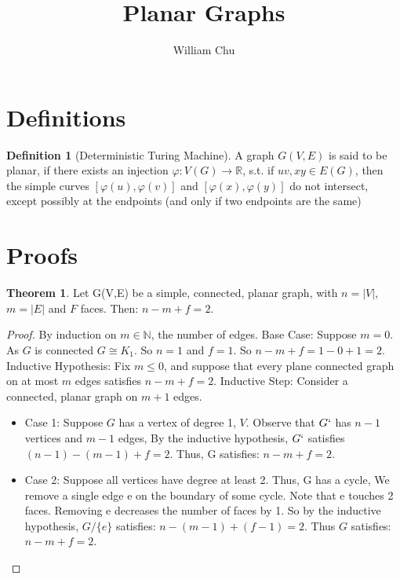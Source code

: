 \documentclass{article}
\theoremstyle{definition}
\newtheorem{definition}{Definition}[section]
\newtheorem{theorem}{Theorem}[section]
\begin{document}
 

\title{Planar Graphs} 
\author{William Chu} 
\maketitle 

\section{Definitions}

\begin{definition}[Deterministic Turing Machine]
A graph $G(V, E)$ is  said to be planar, if there exists an injection $\varphi: V(G)\rightarrow\mathbb{R}$, s.t. if $uv, xy \in E(G)$, then the simple curves $[\varphi(u), \varphi(v)]$ and $[\varphi(x), \varphi(y)]$ do not intersect, except possibly at the endpoints (and only if two endpoints are the same)
\end{definition}

\section{Proofs}

\begin{theorem}
Let G(V,E) be a simple, connected, planar graph, with $n = |V|$, $m = |E|$ and $F$ faces. Then: $n-m+f = 2$.
\end{theorem}
\begin{proof}
By induction on $m \in \mathbb{N}$, the number of edges. Base Case: Suppose $m=0$. As $G$ is connected $G \cong K_1$. So $n = 1$ and $f = 1$. So $n-m+f=1-0+1=2$. Inductive Hypothesis: Fix $m \leq 0$, and suppose that every plane connected graph on at most $m$ edges satisfies $n-m+f =2$. Inductive Step: Consider a connected, planar graph on $m+1$ edges.
\begin{itemize}
\item Case 1: Suppose $G$ has a vertex of degree 1, $V$. Observe that $G`$ has $n-1$ vertices and $m-1$ edges, By the inductive hypothesis, $G`$ satisfies $(n-1)-(m-1)+f=2$. Thus, G satisfies: $n-m+f=2$.
\item Case 2: Suppose all vertices have degree at least 2. Thus, G has a cycle, We remove a single edge e on the boundary of some cycle. Note that e touches 2 faces. Removing e decreases the number of faces by 1. So by the inductive hypothesis, $G/\{e\}$ satisfies: $n-(m-1)+(f-1)=2$. Thus $G$ satisfies: $n-m+f=2$.
\end{itemize}
\end{proof}
\end{document}
